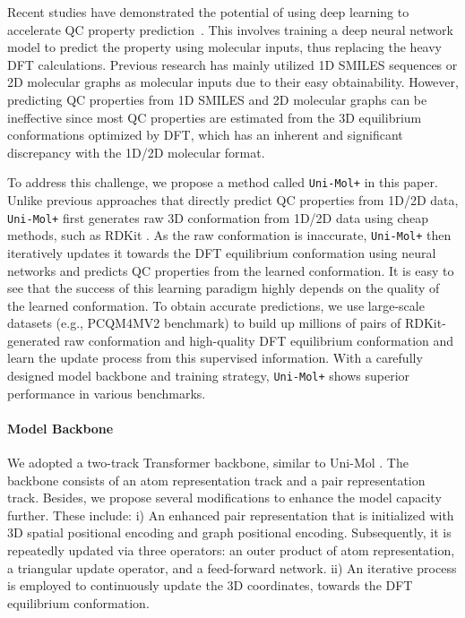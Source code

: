 \documentclass{article}
\newcommand{\name}{\texttt{Uni-Mol+}\xspace}
\begin{document}
Recent studies have demonstrated the potential of using deep learning to accelerate QC property prediction~\cite{luo2022one, ying2021transformers, shi2022benchmarking}. This involves training a deep neural network model to predict the property using molecular inputs, thus replacing the heavy DFT calculations. Previous research has mainly utilized 1D SMILES \cite{wang2019smiles, ross2022large, gomez2018automatic} sequences or 2D molecular graphs \cite{gilmer2017neural, luo2022your, kim2022pure, park2022grpe, hussain2022global, ying2021transformers} as molecular inputs due to their easy obtainability. However, predicting QC properties from 1D SMILES and 2D molecular graphs can be ineffective since most QC properties are estimated from the 3D equilibrium conformations optimized by DFT, which has an inherent and significant discrepancy with the 1D/2D molecular format. 

To address this challenge, we propose a method called \name in this paper. Unlike previous approaches that directly predict QC properties from 1D/2D data, \name first generates raw 3D conformation from 1D/2D data using cheap methods, such as RDKit \cite{landrum2016rdkit}. As the raw conformation is inaccurate, \name then iteratively updates it towards the DFT equilibrium conformation using neural networks and predicts QC properties from the learned conformation. It is easy to see that the success of this learning paradigm highly depends on the quality of the learned conformation. To obtain accurate predictions, we use large-scale datasets (e.g.,  PCQM4MV2 benchmark) to build up millions of pairs of RDKit-generated raw conformation and high-quality DFT equilibrium conformation and learn the update process from this supervised information. With a carefully designed model backbone and training strategy, \name shows superior performance in various benchmarks.

\vspace{-6pt}
\paragraph{Model Backbone} 
We adopted a two-track Transformer backbone, similar to Uni-Mol \cite{zhou2022uni}. The backbone consists of an atom representation track and a pair representation track.
Besides, we propose several modifications to enhance the model capacity further. These include:
i) An enhanced pair representation that is initialized with 3D spatial positional encoding and graph positional encoding. Subsequently, it is repeatedly updated via three operators: an outer product of atom representation, a triangular update operator, and a feed-forward network.
ii) An iterative process is employed to continuously update the 3D coordinates, towards the DFT equilibrium conformation.
\end{document}

